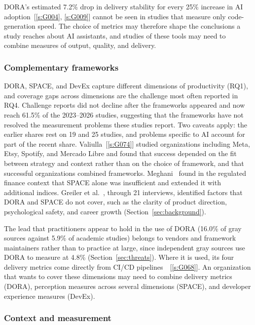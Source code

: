 \documentclass[preprint,number]{elsarticle}
\newcounter{study}
\newcommand{\refG}[1]{\ref{s:#1}}
\begin{document}
DORA's estimated 7.2\% drop in delivery stability for every 25\% increase in AI adoption~[\refG{G004}, \refG{G009}] cannot be seen in studies that measure only code-generation speed. The choice of metrics may therefore shape the conclusions a study reaches about AI assistants, and studies of these tools may need to combine measures of output, quality, and delivery.

\subsubsection{Complementary frameworks}

DORA, SPACE, and DevEx capture different dimensions of productivity (RQ1), and coverage gaps across dimensions are the challenge most often reported in RQ4. Challenge reports did not decline after the frameworks appeared and now reach 61.5\% of the 2023--2026 studies, suggesting that the frameworks have not resolved the measurement problems these studies report. Two caveats apply: the earlier shares rest on 19 and 25 studies, and problems specific to AI account for part of the recent share. Valiulla~[\refG{G074}] studied organizations including Meta, Etsy, Spotify, and Mercado Libre and found that success depended on the fit between strategy and context rather than on the choice of framework, and that successful organizations combined frameworks. Meghani~\cite{P1261} found in the regulated finance context that SPACE alone was insufficient and extended it with additional indices. Greiler et al.~\cite{P0021}, through 21 interviews, identified factors that DORA and SPACE do not cover, such as the clarity of product direction, psychological safety, and career growth (Section~\ref{sec:background}).

The lead that practitioners appear to hold in the use of DORA (16.0\% of gray sources against 5.9\% of academic studies) belongs to vendors and framework maintainers rather than to practice at large, since independent gray sources use DORA to measure at 4.8\% (Section~\ref{sec:threats}). Where it is used, its four delivery metrics come directly from CI/CD pipelines~\cite{P0470}~[\refG{G068}]. An organization that wants to cover these dimensions may need to combine delivery metrics (DORA), perception measures across several dimensions (SPACE), and developer experience measures (DevEx).

\subsubsection{Context and measurement}
\end{document}

